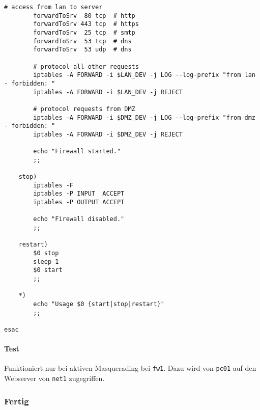 \begin{lstlisting}[label=lst:masq,caption={Basisskript interne Firewall.}]
        # access from lan to server
        forwardToSrv  80 tcp  # http
        forwardToSrv 443 tcp  # https
        forwardToSrv  25 tcp  # smtp
        forwardToSrv  53 tcp  # dns
        forwardToSrv  53 udp  # dns

        # protocol all other requests
        iptables -A FORWARD -i $LAN_DEV -j LOG --log-prefix "from lan - forbidden: "
        iptables -A FORWARD -i $LAN_DEV -j REJECT

        # protocol requests from DMZ
        iptables -A FORWARD -i $DMZ_DEV -j LOG --log-prefix "from dmz - forbidden: "
        iptables -A FORWARD -i $DMZ_DEV -j REJECT

        echo "Firewall started."
        ;;

    stop)
        iptables -F
        iptables -P INPUT  ACCEPT
        iptables -P OUTPUT ACCEPT

        echo "Firewall disabled."
        ;;

    restart)
        $0 stop
        sleep 1
        $0 start
        ;;

    *)
        echo "Usage $0 {start|stop|restart}"
        ;;

esac
\end{lstlisting}

\paragraph{Test} Funktioniert nur bei aktiven Masquerading bei {\tt fw1}.
Dazu wird von {\tt pc01} auf den Webserver von {\tt net1} zugegriffen.


\subsubsection{Fertig}

